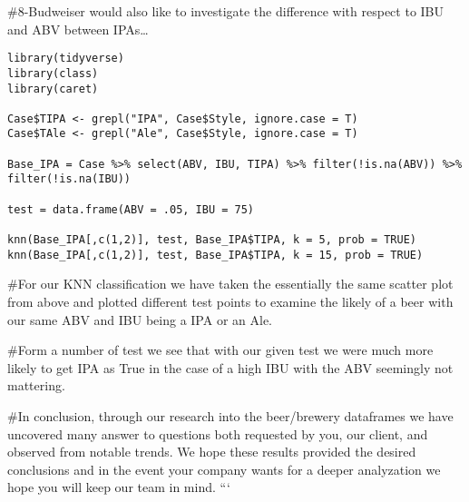 \documentclass[
]{article}
\begin{document}
\#8-Budweiser would also like to investigate the difference with respect
to IBU and ABV between IPAs\ldots{}

\begin{verbatim}
library(tidyverse)
library(class)
library(caret)

Case$TIPA <- grepl("IPA", Case$Style, ignore.case = T)
Case$TAle <- grepl("Ale", Case$Style, ignore.case = T)

Base_IPA = Case %>% select(ABV, IBU, TIPA) %>% filter(!is.na(ABV)) %>% filter(!is.na(IBU))

test = data.frame(ABV = .05, IBU = 75)
 
knn(Base_IPA[,c(1,2)], test, Base_IPA$TIPA, k = 5, prob = TRUE)
knn(Base_IPA[,c(1,2)], test, Base_IPA$TIPA, k = 15, prob = TRUE)
\end{verbatim}

\#For our KNN classification we have taken the essentially the same
scatter plot from above and plotted different test points to examine the
likely of a beer with our same ABV and IBU being a IPA or an Ale.

\#Form a number of test we see that with our given test we were much
more likely to get IPA as True in the case of a high IBU with the ABV
seemingly not mattering.

\#In conclusion, through our research into the beer/brewery dataframes
we have uncovered many answer to questions both requested by you, our
client, and observed from notable trends. We hope these results provided
the desired conclusions and in the event your company wants for a deeper
analyzation we hope you will keep our team in mind. ```
\end{document}
